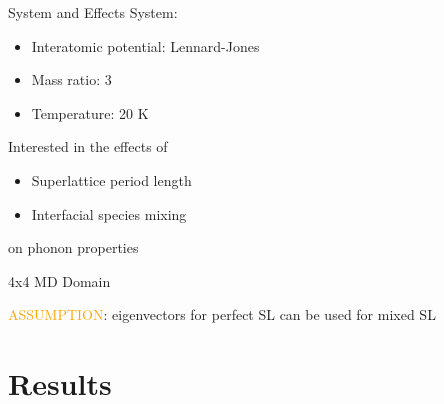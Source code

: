 \documentclass{beamer}
\begin{document}
\begin{frame}{System and Effects}
System:
\begin{itemize}
\item Interatomic potential: Lennard-Jones
\item Mass ratio: 3
\item Temperature: 20 K
\end{itemize}
\newline
\newline
Interested in the effects of
\begin{itemize}
\item Superlattice period length
\item Interfacial species mixing
\end{itemize}
on phonon properties
\end{frame}

\begin{frame}{\small{4x4 MD Domain}}
\begin{figure}[t]
\begin{center}
\vspace*{-0.8cm}
\renewcommand{\figure}{Fig.}
\label{fig:md_domain}
\end{center}
\end{figure}

\hspace{-0.5cm}\textcolor{orange}{ASSUMPTION}: eigenvectors for perfect SL can be used for mixed SL

\end{frame}

\section{Results}
\end{document}
